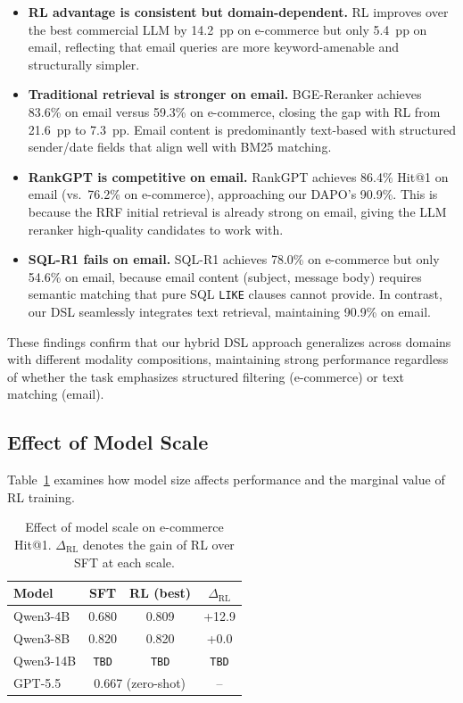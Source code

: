 \documentclass[11pt]{article}
\begin{document}
\begin{itemize}[leftmargin=*,nosep]
\item \textbf{RL advantage is consistent but domain-dependent.} RL improves over the best commercial LLM by 14.2~pp on e-commerce but only 5.4~pp on email, reflecting that email queries are more keyword-amenable and structurally simpler.

\item \textbf{Traditional retrieval is stronger on email.} BGE-Reranker achieves 83.6\% on email versus 59.3\% on e-commerce, closing the gap with RL from 21.6~pp to 7.3~pp. Email content is predominantly text-based with structured sender/date fields that align well with BM25 matching.

\item \textbf{RankGPT is competitive on email.} RankGPT achieves 86.4\% Hit@1 on email (vs.\ 76.2\% on e-commerce), approaching our DAPO's 90.9\%. This is because the RRF initial retrieval is already strong on email, giving the LLM reranker high-quality candidates to work with.

\item \textbf{SQL-R1 fails on email.} SQL-R1 achieves 78.0\% on e-commerce but only 54.6\% on email, because email content (subject, message body) requires semantic matching that pure SQL \texttt{LIKE} clauses cannot provide. In contrast, our DSL seamlessly integrates text retrieval, maintaining 90.9\% on email.
\end{itemize}

These findings confirm that our hybrid DSL approach generalizes across domains with different modality compositions, maintaining strong performance regardless of whether the task emphasizes structured filtering (e-commerce) or text matching (email).


\subsection{Effect of Model Scale}
\label{sec:scaling}

Table~\ref{tab:scaling} examines how model size affects performance and the marginal value of RL training.

\begin{table}[t]
\centering
\small
\caption{Effect of model scale on e-commerce Hit@1. $\Delta_\text{RL}$ denotes the gain of RL over SFT at each scale.}
\label{tab:scaling}
\begin{tabular}{lccc}
\toprule
\textbf{Model} & \textbf{SFT} & \textbf{RL (best)} & \textbf{$\Delta_\text{RL}$} \\
\midrule
Qwen3-4B & 0.680 & 0.809 & +12.9 \\
Qwen3-8B & 0.820 & 0.820 & +0.0 \\
Qwen3-14B & \texttt{TBD} & \texttt{TBD} & \texttt{TBD} \\
\midrule
GPT-5.5 & \multicolumn{2}{c}{0.667 (zero-shot)} & -- \\
\bottomrule
\end{tabular}
\end{table}
\end{document}
